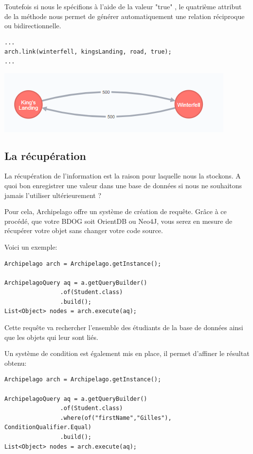 \documentclass[a4paper,fleqn,12pt]{report}
\begin{document}
Toutefois si nous le spécifions à l'aide de la valeur "true" , le quatrième attribut de la méthode nous permet de générer automatiquement une relation réciproque ou bidirectionnelle. 

\begin{lstlisting}
...
arch.link(winterfell, kingsLanding, road, true);
...
\end{lstlisting}


\begin{center}
\includegraphics[scale=1]{figures/RelBidir.png}
\label{fig:RelationBiDir}
\end{center}

\subsection{La récupération}

La récupération de l'information est la raison pour laquelle nous la stockons. A quoi bon enregistrer une valeur dans une base de données si nous ne souhaitons jamais l'utiliser ultérieurement ?

Pour cela, Archipelago offre un système de création de requête. Grâce à ce procédé, que votre BDOG soit OrientDB ou Neo4J, vous serez en mesure de récupérer votre objet sans changer votre code source. 

Voici un exemple:

\begin{lstlisting}
Archipelago arch = Archipelago.getInstance();

ArchipelagoQuery aq = a.getQueryBuilder()
                .of(Student.class)
                .build();
List<Object> nodes = arch.execute(aq);
\end{lstlisting}

Cette requête va rechercher l'ensemble des étudiants de la base de données ainsi que les objets qui leur sont liés.

Un système de condition est également mis en place, il permet d'affiner le résultat obtenu: 

\begin{lstlisting}
Archipelago arch = Archipelago.getInstance();

ArchipelagoQuery aq = a.getQueryBuilder()
                .of(Student.class)
                .where(of("firstName","Gilles"), ConditionQualifier.Equal)
                .build();
List<Object> nodes = arch.execute(aq);
\end{lstlisting}
\end{document}
